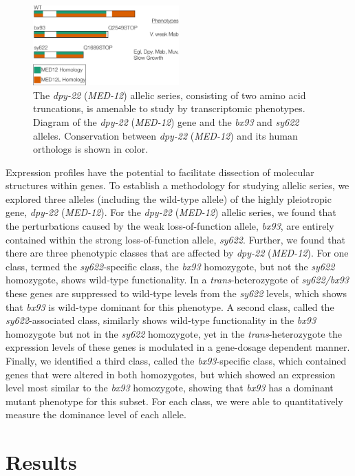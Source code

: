 \documentclass[10pt, twocolumn]{article}
\newcommand{\gene}[1]{\mbox{\emph{#1}}}
\newcommand{\dpy}{\gene{dpy-22} (\emph{MED-12})}
\begin{document}
\begin{figure}
  \centering{}
  \includegraphics[width=0.5\textwidth]{../figs/gene_model_dpy22.pdf}
  \caption{
    The \dpy{} allelic series, consisting of two amino acid truncations,
    is amenable to study by transcriptomic phenotypes. Diagram of
    the \dpy{} gene and the \emph{bx93} and \emph{sy622} alleles. Conservation
    between \dpy{} and its human orthologs is shown in color.
    }
\label{fig:dpy22}
\end{figure}

Expression profiles have the potential to facilitate
dissection of molecular structures within genes. To establish a methodology for
studying allelic series, we explored three alleles (including the wild-type
allele) of the highly pleiotropic gene, \dpy{}. For the \dpy{} allelic series, we
found that the perturbations caused by the weak loss-of-function allele,
\emph{bx93}, are entirely contained within the strong loss-of-function allele,
\emph{sy622}. Further, we found that there are three phenotypic classes that are
affected by \dpy{}. For one class, termed the \emph{sy622}-specific class, the
\emph{bx93} homozygote, but not the \emph{sy622} homozygote, shows wild-type
functionality. In a \emph{trans}-heterozygote of \emph{sy622/bx93} these genes are
suppressed to wild-type levels from the \emph{sy622} levels, which shows that
\emph{bx93} is wild-type dominant for this phenotype. A second class, called the
\emph{sy622}-associated class, similarly shows wild-type functionality in the
\emph{bx93} homozygote but not in the \emph{sy622} homozygote, yet in the
\emph{trans}-heterozygote the expression levels of these genes is modulated in a
gene-dosage dependent manner. Finally, we identified a third class, called the
\emph{bx93}-specific class, which contained genes that were altered in both
homozygotes, but which showed an expression level most similar to the
\emph{bx93} homozygote, showing that \emph{bx93} has a dominant mutant phenotype
for this subset. For each class, we were able to quantitatively measure the
dominance level of each allele.


\section*{Results}
\end{document}
